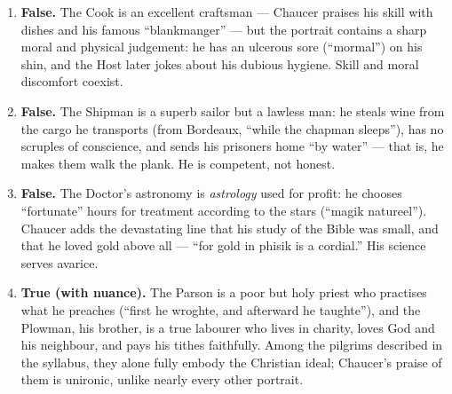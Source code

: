 \documentclass[11pt]{article}
\begin{document}
\begin{corrige}
\begin{enumerate}
\item \textbf{False.} The Cook is an excellent craftsman --- Chaucer praises his skill with dishes and his famous ``blankmanger'' --- but the portrait contains a sharp moral and physical judgement: he has an ulcerous sore (``mormal'') on his shin, and the Host later jokes about his dubious hygiene. Skill and moral discomfort coexist.
\item \textbf{False.} The Shipman is a superb sailor but a lawless man: he steals wine from the cargo he transports (from Bordeaux, ``while the chapman sleeps''), has no scruples of conscience, and sends his prisoners home ``by water'' --- that is, he makes them walk the plank. He is competent, not honest.
\item \textbf{False.} The Doctor's astronomy is \emph{astrology} used for profit: he chooses ``fortunate'' hours for treatment according to the stars (``magik natureel''). Chaucer adds the devastating line that his study of the Bible was small, and that he loved gold above all --- ``for gold in phisik is a cordial.'' His science serves avarice.
\item \textbf{True (with nuance).} The Parson is a poor but holy priest who practises what he preaches (``first he wroghte, and afterward he taughte''), and the Plowman, his brother, is a true labourer who lives in charity, loves God and his neighbour, and pays his tithes faithfully. Among the pilgrims described in the syllabus, they alone fully embody the Christian ideal; Chaucer's praise of them is unironic, unlike nearly every other portrait.
\end{enumerate}
\end{corrige}
\end{document}
